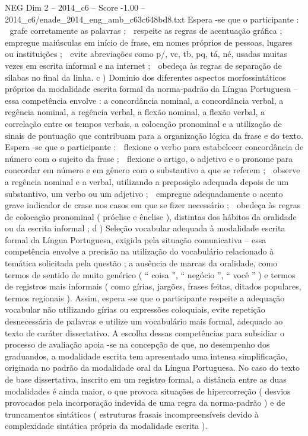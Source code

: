 \begin{textsample}{NEG Dim 2 – 2014\_c6 – Score -1.00 – 2014\_c6/enade\_2014\_eng\_amb\_c63c648bd8.txt}
Espera -se que o participante :  grafe corretamente as palavras ;  respeite as regras de acentuação gráfica ;  empregue maiúsculas em início de frase, em nomes próprios de pessoas, lugares ou instituições ;  evite abreviações como p/, vc, tb, pq, tá, né, usadas muitas vezes em escrita informal e na internet ;  obedeça às regras de separação de sílabas no final da linha. c ) Domínio dos diferentes aspectos morfossintáticos próprios da modalidade escrita formal da norma-padrão da Língua Portuguesa – essa competência envolve : a concordância nominal, a concordância verbal, a regência nominal, a regência verbal, a flexão nominal, a flexão verbal, a correlação entre os tempos verbais, a colocação pronominal e a utilização de sinais de pontuação que contribuam para a organização lógica da frase e do texto.
Espera -se que o participante :  flexione o verbo para estabelecer concordância de número com o sujeito da frase ;  flexione o artigo, o adjetivo e o pronome para concordar em número e em gênero com o substantivo a que se referem ;  observe a regência nominal e a verbal, utilizando a preposição adequada depois de um substantivo, um verbo ou um adjetivo ;  empregue adequadamente o acento grave indicador de crase nos casos em que se fizer necessário ;  obedeça às regras de colocação pronominal ( próclise e ênclise ), distintas dos hábitos da oralidade ou da escrita informal ; d ) Seleção vocabular adequada à modalidade escrita formal da Língua Portuguesa, exigida pela situação comunicativa – essa competência envolve a precisão na utilização do vocabulário relacionado à temática solicitada pela questão ; a ausência de marcas da oralidade, como termos de sentido de muito genérico ( “ coisa ”, “ negócio ”, “ você ” ) e termos de registros mais informais ( como gírias, jargões, frases feitas, ditados populares, termos regionais ).
Assim, espera -se que o participante respeite a adequação vocabular não utilizando gírias ou expressões coloquiais, evite repetição desnecessária de palavras e utilize um vocabulário mais formal, adequado ao texto de caráter dissertativo.
A escolha dessas competências para subsidiar o processo de avaliação apoia -se na concepção de que, no desempenho dos graduandos, a modalidade escrita tem apresentado uma intensa simplificação, originada no padrão da modalidade oral da Língua Portuguesa.
No caso do texto de base dissertativa, inscrito em um registro formal, a distância entre as duas modalidades é ainda maior, o que provoca situações de hipercorreção ( desvios provocados pela incorporação indevida de uma regra da norma-padrão ) e de truncamentos sintáticos ( estruturas frasais incompreensíveis devido à complexidade sintática própria da modalidade escrita ).

\end{textsample}
